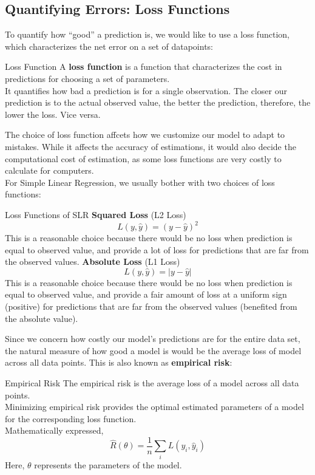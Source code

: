 \subsection{Quantifying Errors: Loss Functions}
To quantify how ``good'' a prediction is, we would like to use a loss function, which characterizes the net error on a set of datapoints:
\begin{ln-define}{Loss Function}{}
    A \textbf{loss function} is a function that characterizes the cost in predictions for choosing a set of parameters. \\
    It quantifies how bad a prediction is for a single observation. The closer our prediction is to the actual observed value, the better the prediction, therefore, the lower the loss. Vice versa.
\end{ln-define}
The choice of loss function affcets how we customize our model to adapt to mistakes. While it affects the accuracy of estimations, it would also decide the computational cost of estimation, as some loss functions are very costly to calculate for computers. \\
For Simple Linear Regression, we usually bother with two choices of loss functions:
\begin{ln-define}[sidebyside]{Loss Functions of SLR}{}
    \textbf{Squared Loss} (L2 Loss) \\
    \[L(y, \hat{y}) = {(y - \hat{y})}^2\]
    This is a reasonable choice because there would be no loss when prediction is equal to observed value, and provide a lot of loss for predictions that are far from the observed values.
    \tcblower
    \textbf{Absolute Loss} (L1 Loss) \\
    \[L(y, \hat{y}) = |y - \hat{y}|\]
    This is a reasonable choice because there would be no loss when prediction is equal to observed value, and provide a fair amount of loss at a uniform sign (positive) for predictions that are far from the observed values (benefited from the absolute value).
\end{ln-define}
Since we concern how costly our model's predictions are for the entire data set, the natural measure of how good a model is would be the average loss of model across all data points. This is also known as \textbf{empirical risk}:
\begin{ln-define}{Empirical Risk}{}
    The empirical risk is the average loss of a model across all data points. \\
    Minimizing empirical risk provides the optimal estimated parameters of a model for the corresponding loss function. \\
    Mathematically expressed,
    \[\hat{R}(\theta) = \frac{1}{n} \sum_i L(y_i, \hat{y}_i)\]
    Here, $\theta$ represents the parameters of the model.
\end{ln-define}
